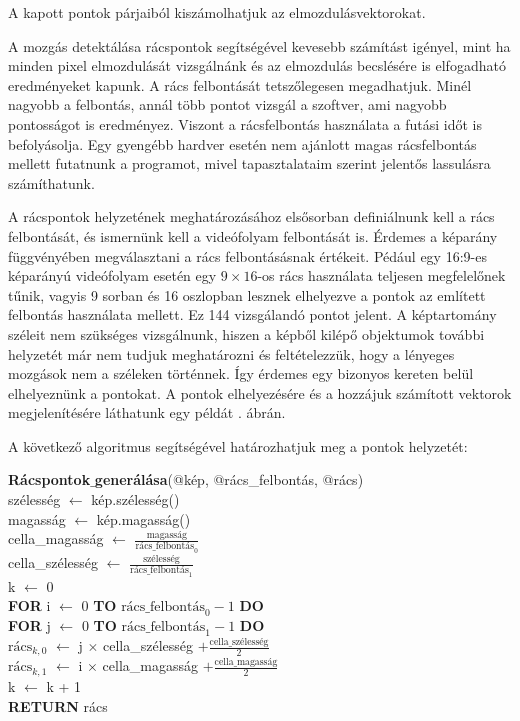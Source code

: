 A kapott pontok párjaiból kiszámolhatjuk az elmozdulásvektorokat.

A mozgás detektálása rácspontok segítségével kevesebb számítást igényel, mint ha minden pixel elmozdulását vizsgálnánk és az elmozdulás becslésére is elfogadható eredményeket kapunk.
A rács felbontását tetszőlegesen megadhatjuk. Minél nagyobb a felbontás, annál több pontot vizsgál a szoftver, ami nagyobb pontosságot is eredményez. Viszont a rácsfelbontás használata a futási időt is befolyásolja. Egy gyengébb hardver esetén nem ajánlott magas rácsfelbontás mellett futatnunk a programot, mivel tapasztalataim szerint jelentős lassulásra számíthatunk.

A rácspontok helyzetének meghatározásához elsősorban definiálnunk kell a rács felbontását, és ismernünk kell a videófolyam felbontását is. Érdemes a képarány függvényében megválasztani a rács felbontásásnak értékeit. Pédául egy 16:9-es képarányú videófolyam esetén egy $9 \times 16$-os rács használata teljesen megfelelőnek tűnik, vagyis 9 sorban és 16 oszlopban lesznek elhelyezve a pontok az említett felbontás használata mellett. Ez 144 vizsgálandó pontot jelent.
A képtartomány széleit nem szükséges vizsgálnunk, hiszen a képből kilépő objektumok további helyzetét már nem tudjuk meghatározni és feltételezzük, hogy a lényeges mozgások nem a széleken történnek. Így érdemes egy bizonyos kereten belül elhelyeznünk a pontokat.
A pontok elhelyezésére és a hozzájuk számított vektorok megjelenítésére láthatunk egy példát . ábrán.

\bigskip

\noindent A következő algoritmus segítségével határozhatjuk meg a pontok helyzetét:

\medskip

\noindent \textbf{Rácspontok$\_$generálása}(@kép, @rács\_felbontás, @rács)\\
szélesség $\leftarrow$ kép.szélesség()\\
magasság $\leftarrow$  kép.magasság()\\
cella\_magasság $\leftarrow$ $\frac{\text{magasság}}{\text{rács\_felbontás}_0}$\\
cella\_szélesség $\leftarrow$ $\frac{\text{szélesség}}{\text{rács\_felbontás}_1}$\\
k $\leftarrow$ 0\\
\textbf{FOR} i $\leftarrow$ 0 \textbf{TO} $\text{rács\_felbontás}_0-1$ \textbf{DO}\\
\indent \textbf{FOR} j $\leftarrow$ 0 \textbf{TO} $\text{rács\_felbontás}_1-1$ \textbf{DO}\\
\indent \indent $\text{rács}_{k,0}$ $\leftarrow$ j $\times$ cella\_szélesség $+ \frac{\text{cella\_szélesség}}{2}$\\
\indent \indent $\text{rács}_{k,1}$ $\leftarrow$ i $\times$ cella\_magasság $+ \frac{\text{cella\_magasság}}{2}$\\
\indent \indent k $\leftarrow$ k + 1\\
\textbf{RETURN} rács

